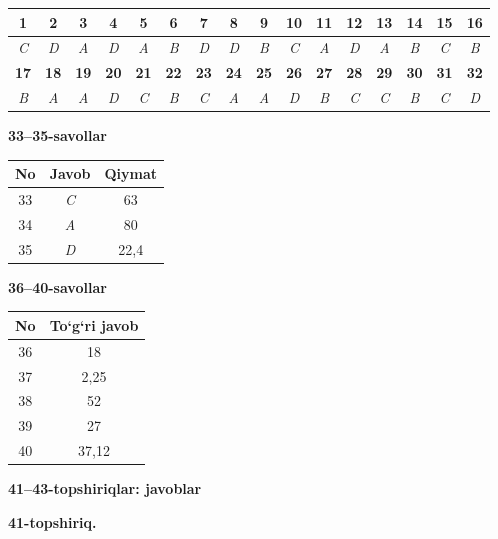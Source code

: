 \documentclass[11pt,a4paper]{article}
\begin{document}
\noindent\begin{tabular}{|c|c|c|c|c|c|c|c|c|c|c|c|c|c|c|c|}\hline
\textbf{1} & \textbf{2} & \textbf{3} & \textbf{4} & \textbf{5} & \textbf{6} & \textbf{7} & \textbf{8} & \textbf{9} & \textbf{10} & \textbf{11} & \textbf{12} & \textbf{13} & \textbf{14} & \textbf{15} & \textbf{16}\\\hline
\textsl{C} & \textsl{D} & \textsl{A} & \textsl{D} & \textsl{A} & \textsl{B} & \textsl{D} & \textsl{D} & \textsl{B} & \textsl{C} & \textsl{A} & \textsl{D} & \textsl{A} & \textsl{B} & \textsl{C} & \textsl{B}\\\hline
\textbf{17} & \textbf{18} & \textbf{19} & \textbf{20} & \textbf{21} & \textbf{22} & \textbf{23} & \textbf{24} & \textbf{25} & \textbf{26} & \textbf{27} & \textbf{28} & \textbf{29} & \textbf{30} & \textbf{31} & \textbf{32}\\\hline
\textsl{B} & \textsl{A} & \textsl{A} & \textsl{D} & \textsl{C} & \textsl{B} & \textsl{C} & \textsl{A} & \textsl{A} & \textsl{D} & \textsl{B} & \textsl{C} & \textsl{C} & \textsl{B} & \textsl{C} & \textsl{D}\\\hline
\end{tabular}\par\medskip
\noindent\textbf{33--35-savollar}\par\smallskip
\noindent\begin{tabular}{|c|c|c|}\hline \textbf{No} & \textbf{Javob} & \textbf{Qiymat}\\\hline
33 & \textsl{C} & 63\\\hline
34 & \textsl{A} & 80\\\hline
35 & \textsl{D} & 22,4\\\hline
\end{tabular}\par\medskip
\noindent\textbf{36--40-savollar}\par\smallskip
\noindent\begin{tabular}{|c|c|}\hline \textbf{No} & \textbf{To`g`ri javob}\\\hline
36 & 18\\\hline
37 & 2,25\\\hline
38 & 52\\\hline
39 & 27\\\hline
40 & 37,12\\\hline
\end{tabular}\par\medskip
\noindent\textbf{41--43-topshiriqlar: javoblar}\par\smallskip
\noindent\textbf{41-topshiriq.}\par
\end{document}
